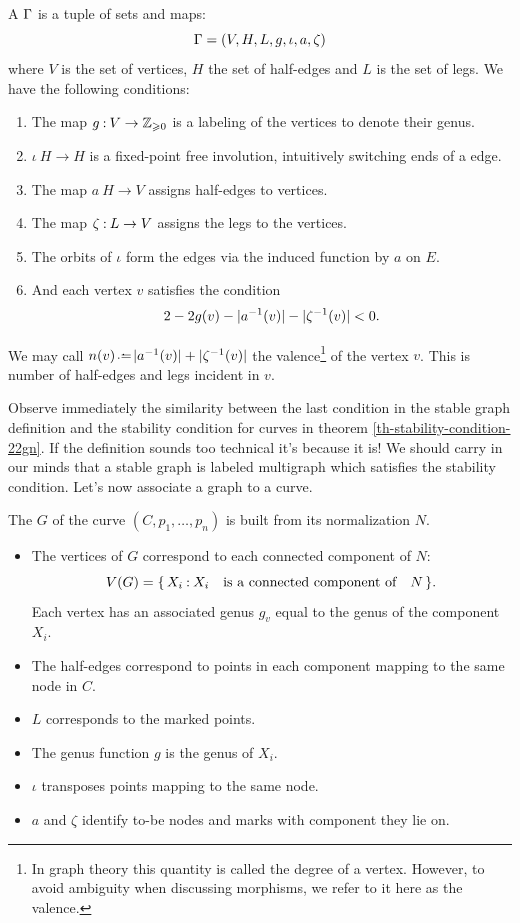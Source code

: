\documentclass[12pt]{memoir}
\begin{document}
\begin{Def}
A  $\Gamma$ is a tuple of sets and maps:
$$\Gamma=(V,H,L,g,\iota,a,\zeta)$$
where $V$ is the set of vertices, $H$ the set of half-edges and $L$ is the set of legs. We have the following conditions:
\begin{enumerate}
    \item The map $g\mathbin{:} V\to\mathbb{Z}_{\geqslant 0}$ is a labeling of the vertices to denote their genus.
    \item $\iota\: H\to H$ is a fixed-point free involution, intuitively switching ends of a edge.
    \item The map $a\: H\to V$ assigns half-edges to vertices.
    \item The map $\zeta\mathbin{:} L\to V$ assigns the legs to the vertices.
    \item The orbits of $\iota$ form the edges via the induced function by $a$ on $E$.
    \item And each vertex $v$ satisfies the condition
    $$2-2g(v)-\lvert a^{-1}(v)\rvert-\lvert \zeta^{-1}(v)\rvert<0.$$
\end{enumerate}    
We may call $n(v)\defeq\lvert a^{-1}(v)\rvert+\lvert \ze^{-1}(v)\rvert$ the valence\footnote{In graph theory this quantity is called the degree of a vertex. However, to avoid ambiguity when discussing morphisms, we refer to it here as the valence.} of the vertex $v$. This is number of half-edges and legs incident in $v$. 
\end{Def}

Observe immediately the similarity between the last condition in the stable graph definition and the stability condition for curves in theorem \ref{th-stability-condition-22gn}. 
If the definition sounds too technical it's because it is! We should carry in our minds that a stable graph is labeled multigraph which satisfies the stability condition. Let's now associate a graph to a curve.

\begin{Def}
    The  $G$ of the curve $(C,
p_1,\dots,p_n)$ is built from its normalization $N$. 
\begin{itemize}
    \item The vertices of $G$ correspond to each connected component of $N$:
    $$V(G)=\{\,X_i\mathbin{:} X_i\quad\text{is a connected component of}\quad N\,\}.$$
    Each vertex has an associated genus $g_v$ equal to the genus of the component $X_i$.
    \item The half-edges correspond to points in each component mapping to the same node in $C$.
    \item $L$ corresponds to the marked points.
    \item The genus function $g$ is the genus of $X_i$.
    \item $\iota$ transposes points mapping to the same node.
    \item $a$ and $\zeta$ identify to-be nodes and marks with component they lie on.
\end{itemize}
\end{Def}
\end{document}
